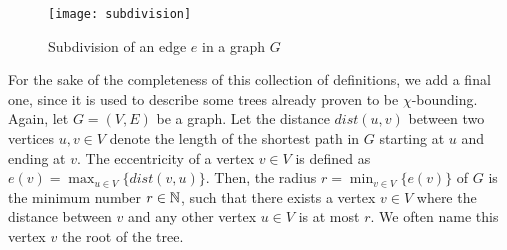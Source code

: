 \begin{figure}[ht]
\begin{center}
\texttt{[image: subdivision]}
\end{center}
\caption{Subdivision of an edge $e$ in a graph $G$}
\label{f2ba}
\end{figure}


For the sake of the completeness of this collection of definitions, we add a final one, since it is used to describe some trees already proven to be $\chi$-bounding. Again, let $G=(V,E)$ be a graph. Let the distance $dist(u,v)$ between two vertices $u,v\in V$ denote the length of the shortest path in $G$ starting at $u$ and ending at $v$. The eccentricity of a vertex $v\in V$ is defined as $\displaystyle e(v)=\max_{u \in V}\lbrace dist(v,u)\rbrace$. Then, the radius $\displaystyle r= \min_{v\in V}\lbrace e(v)\rbrace$ of $G$ is the minimum number $r\in\mathbb{N}$, such that there exists a vertex $v\in V$ where the distance between $v$ and any other vertex $u\in V$ is at most $r$. We often name this vertex $v$ the root of the tree.